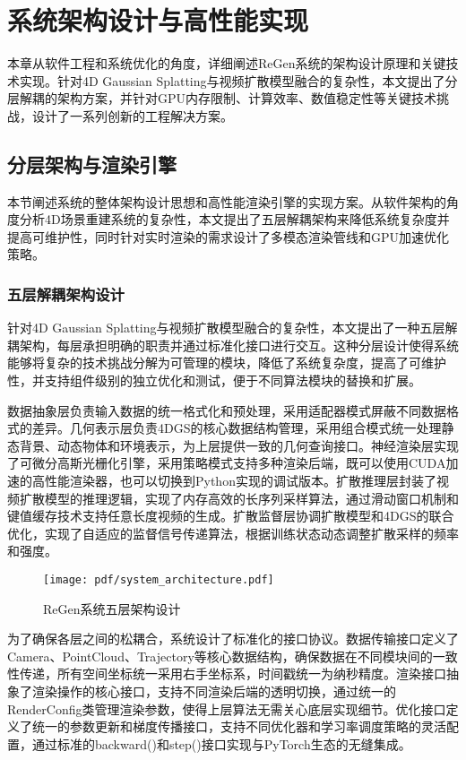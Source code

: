 
\chapter{系统架构设计与高性能实现}

本章从软件工程和系统优化的角度，详细阐述ReGen系统的架构设计原理和关键技术实现。针对4D Gaussian Splatting与视频扩散模型融合的复杂性，本文提出了分层解耦的架构方案，并针对GPU内存限制、计算效率、数值稳定性等关键技术挑战，设计了一系列创新的工程解决方案。

\section{分层架构与渲染引擎}

本节阐述系统的整体架构设计思想和高性能渲染引擎的实现方案。从软件架构的角度分析4D场景重建系统的复杂性，本文提出了五层解耦架构来降低系统复杂度并提高可维护性，同时针对实时渲染的需求设计了多模态渲染管线和GPU加速优化策略。

\subsection{五层解耦架构设计}

针对4D Gaussian Splatting与视频扩散模型融合的复杂性，本文提出了一种五层解耦架构，每层承担明确的职责并通过标准化接口进行交互。这种分层设计使得系统能够将复杂的技术挑战分解为可管理的模块，降低了系统复杂度，提高了可维护性，并支持组件级别的独立优化和测试，便于不同算法模块的替换和扩展。

数据抽象层负责输入数据的统一格式化和预处理，采用适配器模式屏蔽不同数据格式的差异。几何表示层负责4DGS的核心数据结构管理，采用组合模式统一处理静态背景、动态物体和环境表示，为上层提供一致的几何查询接口。神经渲染层实现了可微分高斯光栅化引擎，采用策略模式支持多种渲染后端，既可以使用CUDA加速的高性能渲染器，也可以切换到Python实现的调试版本。扩散推理层封装了视频扩散模型的推理逻辑，实现了内存高效的长序列采样算法，通过滑动窗口机制和键值缓存技术支持任意长度视频的生成。扩散监督层协调扩散模型和4DGS的联合优化，实现了自适应的监督信号传递算法，根据训练状态动态调整扩散采样的频率和强度。

\begin{figure}[htbp]
  \centering
  \texttt{[image: pdf/system\_architecture.pdf]}
  \caption{ReGen系统五层架构设计}
  \label{fig:system-architecture}
\end{figure}

为了确保各层之间的松耦合，系统设计了标准化的接口协议。数据传输接口定义了Camera、PointCloud、Trajectory等核心数据结构，确保数据在不同模块间的一致性传递，所有空间坐标统一采用右手坐标系，时间戳统一为纳秒精度。渲染接口抽象了渲染操作的核心接口，支持不同渲染后端的透明切换，通过统一的RenderConfig类管理渲染参数，使得上层算法无需关心底层实现细节。优化接口定义了统一的参数更新和梯度传播接口，支持不同优化器和学习率调度策略的灵活配置，通过标准的backward()和step()接口实现与PyTorch生态的无缝集成。

